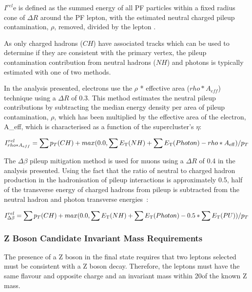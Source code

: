 $I^{rel}$e is defined as the summed energy of all PF particles within a fixed radius cone of $\Delta R$ around the PF lepton, with the estimated neutral charged pileup contamination, $\rho$, removed, divided by the lepton \pT.

As only charged hadrons ($CH$) have associated tracks which can be used to determine if they are consistent with the primary vertex, the pileup contamination contribution from neutral hadrons ($NH$) and photons is typically estimated with one of two methods.

In the analysis presented, electrons use the $\rho$ * effective area ($rho * A_{eff}$) technique using a $\Delta R$ of 0.3.
This method estimates the neutral pileup contributions by subtracting the median energy density per area of pileup contamination, $\rho$, which has been multiplied by the effective area of the electron, A_{\rm eff}, which is characterised as a function of the supercluster's $\eta$:

\begin{equation}
I^{rel}_{rho * A_{eff}} = \sum p_T(CH) + max (0.0, \sum E_{\rm T}(NH) + \sum E_{\rm T}(Photon) -rho*A_{\rm eff} )/p_T \\
\end{equation}\label{eq:rhoEffA}

The $\Delta\beta$ pileup mitigation method is used for muons using a $\Delta R$ of 0.4 in the analysis presented.
Using the fact that the ratio of neutral to charged hadron production in the hadronisation of pileup interactions is approximately 0.5, half of the transverse energy of charged hadrons from pileup is subtracted from the neutral hadron and photon transverse energies~\cite{Chatrchyan:2012vp}:

\begin{equation}
I^{rel}_{\Delta\beta} = \sum p_T(CH) + max (0.0, \sum E_{\rm T}(NH) + \sum E_{\rm T}(Photon) - 0.5 * \sum E_{\rm T}(PU))/p_T \\
\end{equation}\label{eq:deltaBeta}

\subsubsection{Z Boson Candidate Invariant Mass Requirements}
The presence of a Z boson in the final state requires that two leptons selected must be consistent with a Z boson decay.
Therefore, the leptons must have the same flavour and opposite charge and an invariant mass within 20\GeVcc of the known Z mass.

